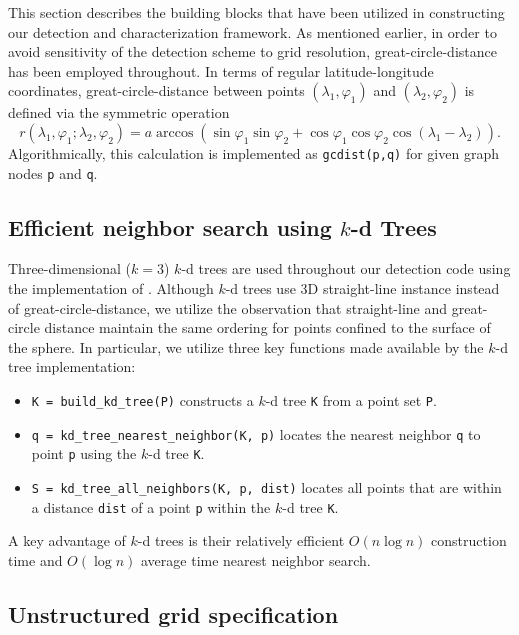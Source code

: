 \documentclass[gmdd, hvmath, online]{copernicus_discussions}
\begin{document}
This section describes the building blocks that have been utilized in constructing our detection and characterization framework.  As mentioned earlier, in order to avoid sensitivity of the detection scheme to grid resolution, great-circle-distance has been employed throughout.  In terms of regular latitude-longitude coordinates, great-circle-distance between points $(\lambda_1, \varphi_1)$ and $(\lambda_2, \varphi_2)$ is defined via the symmetric operation
\begin{equation}
r(\lambda_1, \varphi_1; \lambda_2, \varphi_2) = a \arccos \left( \sin \varphi_1 \sin \varphi_2 + \cos \varphi_1 \cos \varphi_2 \cos (\lambda_1 - \lambda_2) \right).
\end{equation}  Algorithmically, this calculation is implemented as \texttt{gcdist(p,q)} for given graph nodes \texttt{p} and \texttt{q}.

\subsection{Efficient neighbor search using $k$-d Trees}

Three-dimensional ($k=3$) $k$-d trees \citep{bentley1975multidimensional} are used throughout our detection code using the implementation of \cite{tsiombikas2015kdtree}.  Although $k$-d trees use 3D straight-line instance instead of great-circle-distance, we utilize the observation that straight-line and great-circle distance maintain the same ordering for points confined to the surface of the sphere.  In particular, we utilize three key functions made available by the $k$-d tree implementation:
\begin{itemize}
\item[] \texttt{K = build\_kd\_tree(P)} constructs a $k$-d tree \texttt{K} from a point set \texttt{P}.
\item[] \texttt{q = kd\_tree\_nearest\_neighbor(K, p)} locates the nearest neighbor \texttt{q} to point \texttt{p} using the $k$-d tree \texttt{K}.
\item[] \texttt{S = kd\_tree\_all\_neighbors(K, p, dist)} locates all points that are within a distance \texttt{dist} of a point \texttt{p} within the $k$-d tree \texttt{K}.
\end{itemize}

\noindent A key advantage of $k$-d trees is their relatively efficient $O(n \log n)$ construction time and $O(\log n)$ average time nearest neighbor search.

\subsection{Unstructured grid specification}
\end{document}
